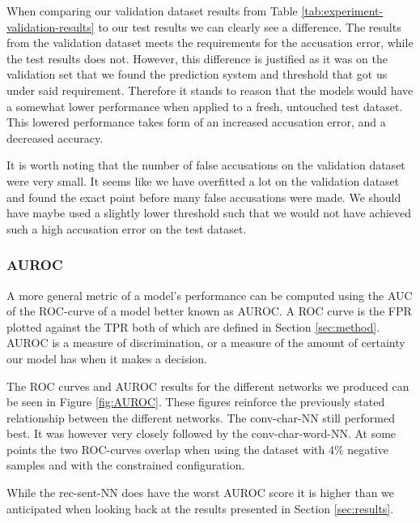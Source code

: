 When comparing our validation dataset results from Table
\ref{tab:experiment-validation-results} to our test results we can clearly see a
difference. The results from the validation dataset meets the requirements for
the accusation error, while the test results does not. However, this difference
is justified as it was on the validation set that we found the prediction system
and threshold that got us under said requirement. Therefore it stands to reason
that the models would have a somewhat lower performance when applied to a fresh,
untouched test dataset. This lowered performance takes form of an increased
accusation error, and a decreased accuracy.

It is worth noting that the number of false accusations on the validation
dataset were very small. It seems like we have overfitted a lot on the
validation dataset and found the exact point before many false accusations were
made. We should have maybe used a slightly lower threshold such that we would
not have achieved such a high accusation error on the test dataset.


\subsubsection{AUROC}

A more general metric of a model's performance can be computed using the
\gls{AUC} of the \gls{ROC}-curve of a model better known as \gls{AUROC}.
A \gls{ROC} curve is the \gls{FPR} plotted against the \gls{TPR} both of
which are defined in Section \ref{sec:method}. \gls{AUROC} is a measure of
discrimination, or a measure of the amount of certainty our model has when it
makes a decision.

The ROC curves and AUROC results for the different networks we produced
can be seen in Figure \ref{fig:AUROC}. These figures reinforce the
previously stated relationship between the different networks. The
\gls{conv-char-NN} still performed best. It was however very closely followed
by the \gls{conv-char-word-NN}. At some points the two \gls{ROC}-curves overlap
when using the dataset with 4\% negative samples and with the constrained
configuration.

While the \gls{rec-sent-NN} does have the worst \gls{AUROC} score it is higher
than we anticipated when looking back at the results presented in Section
\ref{sec:results}. 

